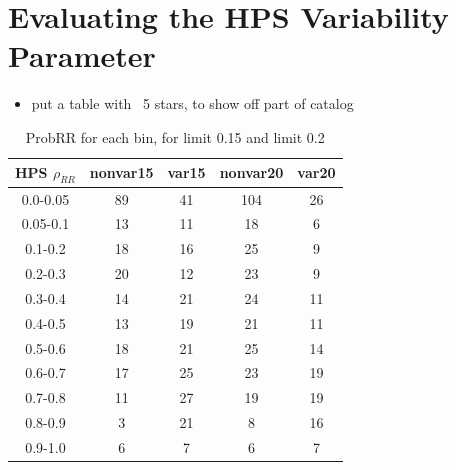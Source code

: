 \documentclass[aps,prb,twocolumn,superscriptaddress]{revtex4-1}
\begin{document}
\section{Evaluating the HPS Variability Parameter}
\begin{itemize}
	\item{} put a table with ~5 stars, to show off part of catalog
\end{itemize}

\iffalse
	\begin{table}[H]
		\begin{center}
			\begin{tabular}{|c|c|c|c|c|}\hline
				HPS $\rho_{RR}$	&	nonvar15	&	var15	&	nonvar20	&	var20 \\ \hline
				0.0-0.05 	&	89 			&	41 		&	104 		&	26 \\ \hline
				0.05-0.1 	&	13 			&	11 		&	18 			&	6 \\ \hline
				0.1-0.2 	&	18 			&	16 		&	25 			&	9 \\ \hline
				0.2-0.3 	&	20 			&	12 		&	23 			&	9 \\ \hline
				0.3-0.4 	&	14 			&	21 		&	24 			&	11 \\ \hline
				0.4-0.5 	&	13 			&	19 		&	21 			&	11 \\ \hline
				0.5-0.6 	&	18 			&	21 		&	25 			&	14 \\ \hline
				0.6-0.7 	&	17 			&	25 		&	23 			&	19 \\ \hline
				0.7-0.8 	&	11 			&	27 		&	19 			&	19 \\ \hline
				0.8-0.9 	&	3 			&	21 		&	8 			&	16 \\ \hline
				0.9-1.0 	&	6 			&	7 		&	6 			&	7 \\ \hline
			\end{tabular}
		\end{center}
	  \caption{ \small{ProbRR for each bin, for limit 0.15 and limit 0.2\label{tab:probbRRbin}}}
	\end{table}	
\end{document}
